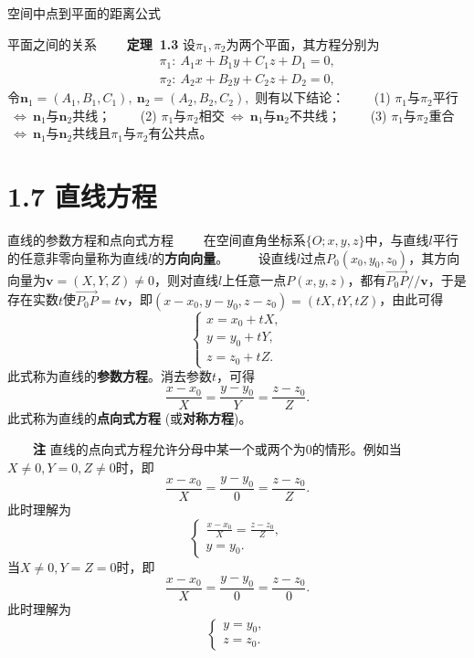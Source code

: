 \documentclass[compress,mathserif,cjk]{beamer}
\theoremstyle{remark}
\numberwithin{equation}{section}
\newcommand{\hei}{\bf}      %
\begin{document}
\begin{CJK}{UTF8}{gbsn}
\begin{frame}{空间中点到平面的距离公式}
\end{frame}

\begin{frame}{平面之间的关系}
\ \ \ \ {\hei 定理~1.3} 设$\pi_1,\pi_2$为两个平面，其方程分别为
\begin{eqnarray*}
&&\pi_1:~A_1x+B_1y+C_1z+D_1=0,\\
&&\pi_2:~A_2x+B_2y+C_2z+D_2=0,
\end{eqnarray*}
令$\bm n_1=(A_1,B_1,C_1),~\bm n_2=(A_2,B_2,C_2),$ 则有以下结论：
\pause\vskip 5pt
\ \ \ \ (1) $\pi_1$与$\pi_2$平行$~\Longleftrightarrow~\bm n_1$与$\bm n_2$共线；
\vskip 5pt
\ \ \ \ (2) $\pi_1$与$\pi_2$相交$~\Longleftrightarrow~\bm n_1$与$\bm n_2$不共线；
\vskip 5pt
\ \ \ \ (3) $\pi_1$与$\pi_2$重合$~\Longleftrightarrow~\bm n_1$与$\bm n_2$共线且$\pi_1$与$\pi_2$有公共点。

\end{frame}

\section[1.7]{1.7 直线方程}
\begin{frame}{直线的参数方程和点向式方程}
 \ \ \ \ 在空间直角坐标系$\{O;x,y,z\}$中，与直线$l$平行的任意非零向量称为直线$l$的{\hei 方向向量}。
 \pause\vskip 10pt
 \ \ \ \ 设直线$l$过点$P_0(x_0,y_0,z_0)$，其方向向量为$\bm v=(X,Y,Z)\neq0$，则对直线$l$上任意一点$P(x,y,z)$，都有$\overset{\longrightarrow}{P_0P}//\bm v$，于是存在实数$t$使$\overset{\longrightarrow}{P_0P}=t\bm v$，即$(x-x_0,y-y_0,z-z_0)=(tX,tY,tZ)$，由此可得
 $$\left\{\begin{array}{l}
 x=x_0+tX,\\y=y_0+tY,\\z=z_0+tZ.
 \end{array}\right.$$
 此式称为直线的{\hei 参数方程}。\pause 消去参数$t$，可得
 $$\frac{x-x_0}X=\frac{y-y_0}Y=\frac{z-z_0}Z.$$
 此式称为直线的{\hei 点向式方程} (或{\hei 对称方程})。

\end{frame}

\begin{frame}
 \ \ \ \ {\hei 注} 直线的点向式方程允许分母中某一个或两个为0的情形。例如当$X\neq0,Y=0,Z\neq0$时，即
 $$\frac{x-x_0}X=\frac{y-y_0}0=\frac{z-z_0}Z.$$
 此时理解为
 $$\left\{\begin{array}{l}
 \frac{x-x_0}X=\frac{z-z_0}Z,\\
 y=y_0.
 \end{array}\right.$$
 \pause 当$X\neq0,Y=Z=0$时，即
 $$\frac{x-x_0}X=\frac{y-y_0}0=\frac{z-z_0}0.$$
 此时理解为
 $$\left\{\begin{array}{l}
 y=y_0,\\
 z=z_0.
 \end{array}\right.$$
\end{frame}


\end{CJK}
\end{document}
